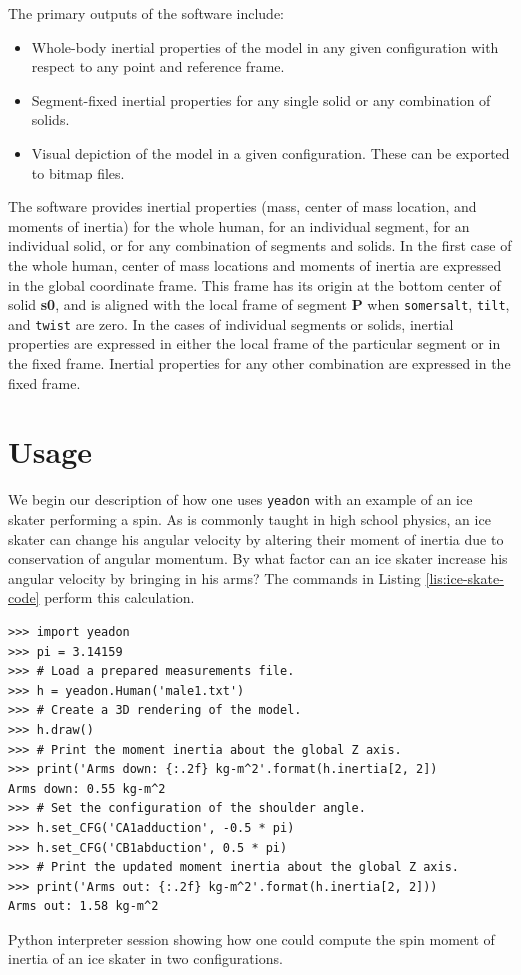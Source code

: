 \documentclass[10pt,a4paper,twocolumn]{article}
\begin{document}
The primary outputs of the software include:

\begin{itemize}
  \item Whole-body inertial properties of the model in any given configuration
    with respect to any point and reference frame.
  \item Segment-fixed inertial properties for any single solid or any
    combination of solids.
  \item Visual depiction of the model in a given configuration. These can be
    exported to bitmap files.
\end{itemize}

The software provides inertial properties (mass, center of mass location, and
moments of inertia) for the whole human, for an individual segment, for an
individual solid, or for any combination of segments and solids. In the first
case of the whole human, center of mass locations and moments of inertia are
expressed in the global coordinate frame. This frame has its origin at the
bottom center of solid \textbf{s0}, and is aligned with the local frame of
segment \textbf{P} when \verb+somersalt+, \verb+tilt+, and \verb+twist+ are
zero. In the cases of individual segments or solids, inertial properties are
expressed in either the local frame of the particular segment or in the fixed
frame. Inertial properties for any other combination are expressed in the fixed
frame.

\section*{Usage}
\label{sec:usage}

We begin our description of how one uses \verb+yeadon+ with an example of an
ice skater performing a spin. As is commonly taught in high school physics, an
ice skater can change his angular velocity by altering their moment of inertia
due to conservation of angular momentum. By what factor can an ice skater
increase his angular velocity by bringing in his arms? The commands in Listing
\ref{lis:ice-skate-code} perform this calculation.

\begin{listing*}
  \begin{verbatim}
>>> import yeadon
>>> pi = 3.14159
>>> # Load a prepared measurements file.
>>> h = yeadon.Human('male1.txt')
>>> # Create a 3D rendering of the model.
>>> h.draw()
>>> # Print the moment inertia about the global Z axis.
>>> print('Arms down: {:.2f} kg-m^2'.format(h.inertia[2, 2])
Arms down: 0.55 kg-m^2
>>> # Set the configuration of the shoulder angle.
>>> h.set_CFG('CA1adduction', -0.5 * pi)
>>> h.set_CFG('CB1abduction', 0.5 * pi)
>>> # Print the updated moment inertia about the global Z axis.
>>> print('Arms out: {:.2f} kg-m^2'.format(h.inertia[2, 2]))
Arms out: 1.58 kg-m^2
  \end{verbatim}
  \caption{Python interpreter session showing how one could compute the spin
    moment of inertia of an ice skater in two configurations.}
  \label{lis:ice-skate-code}
\end{listing*}
\end{document}

